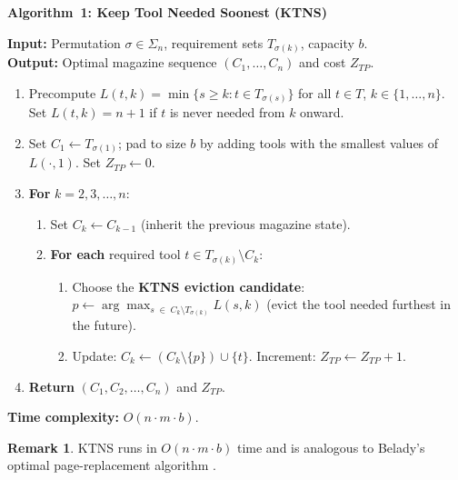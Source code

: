 \documentclass[11pt,a4paper]{article}
\theoremstyle{plain}
\theoremstyle{definition}
\newtheorem{remark}[theorem]{Remark}
\begin{document}
\begin{mdframed}[backgroundcolor=lightblue,linecolor=navyblue,linewidth=1.2pt,
  innerleftmargin=14pt,innerrightmargin=14pt,innertopmargin=10pt,innerbottommargin=10pt]
\textbf{Algorithm~1: Keep Tool Needed Soonest (KTNS)}

\smallskip
\textbf{Input:} Permutation $\sigma \in \Sigma_n$, requirement sets $T_{\sigma(k)}$, capacity $b$.\\
\textbf{Output:} Optimal magazine sequence $(C_1,\ldots,C_n)$ and cost $Z_{TP}$.

\medskip
\begin{enumerate}[noitemsep,label=\textbf{\arabic*.}]
\item Precompute $L(t,k) = \min\{s \ge k : t \in T_{\sigma(s)}\}$ for all $t \in T$,
      $k \in \{1,\ldots,n\}$. Set $L(t,k)=n+1$ if $t$ is never needed from $k$ onward.
\item Set $C_1 \leftarrow T_{\sigma(1)}$; pad to size $b$ by adding tools with the
      smallest values of $L(\cdot,1)$. Set $Z_{TP} \leftarrow 0$.
\item \textbf{For} $k = 2, 3, \ldots, n$:
  \begin{enumerate}[noitemsep,label=\alph*.]
    \item Set $C_k \leftarrow C_{k-1}$ (inherit the previous magazine state).
    \item \textbf{For each} required tool $t \in T_{\sigma(k)} \setminus C_k$:
      \begin{enumerate}[noitemsep,label=\roman*.]
        \item Choose the \textbf{KTNS eviction candidate}:
              $p \leftarrow \displaystyle\arg\max_{s \;\in\; C_k \setminus T_{\sigma(k)}} L(s,k)$
              \quad (evict the tool needed furthest in the future).
        \item Update: $C_k \leftarrow (C_k \setminus \{p\}) \cup \{t\}$.
              Increment: $Z_{TP} \leftarrow Z_{TP} + 1$.
      \end{enumerate}
  \end{enumerate}
\item \textbf{Return} $(C_1, C_2, \ldots, C_n)$ and $Z_{TP}$.
\end{enumerate}
\end{mdframed}
\vspace{4pt}
\noindent\textbf{Time complexity:} $O(n \cdot m \cdot b)$.\label{alg:ktns}

\begin{remark}
KTNS runs in $O(n \cdot m \cdot b)$ time and is analogous to Belady's
optimal page-replacement algorithm \cite{Belady1966}.
\end{remark}
\end{document}
